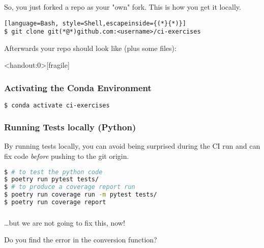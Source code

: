 \begin{frame}[fragile]
	\frametitle{}
	So, you just forked a repo as your "own" fork. This is how you get it locally.
	\begin{lstlisting}[language=Bash, style=Shell,escapeinside={(*}{*)}]
$ git clone git(*@*)github.com:<username>/ci-exercises
	\end{lstlisting}
    Afterwards your repo should look like (plus some files):

\centering
\begin{minipage}[t]{0.8\textwidth}
	{\tiny \DTsetlength{0.2em}{1em}{0.2em}{0.4pt}{.6pt}
		}
\end{minipage}
\end{frame}

\begin{frame}<handout:0>[fragile]
	\frametitle{Activating the Conda Environment}
	\begin{lstlisting}[language=Bash, style=Shell]
$ conda activate ci-exercises
    \end{lstlisting}
\end{frame}

\begin{frame}[fragile]
	\frametitle{Running Tests locally (Python)}
	\begin{warning}
		{By running tests locally, you can avoid being surprised during the CI run and can fix code \emph{before} pushing to the git origin.}
	\end{warning}
    \pause
    \begin{lstlisting}[language=Bash, style=Shell]
$ # to test the python code
$ poetry run pytest tests/
$ # to produce a coverage report run
$ poetry run coverage run -m pytest tests/
$ poetry run coverage report
    \end{lstlisting}	
\end{frame}



\begin{frame}
	\frametitle{}
	\ldots but we are not going to fix this, now!
	\begin{question}
	  {Do you find the error in the conversion function?}
	\end{question}
\end{frame}

